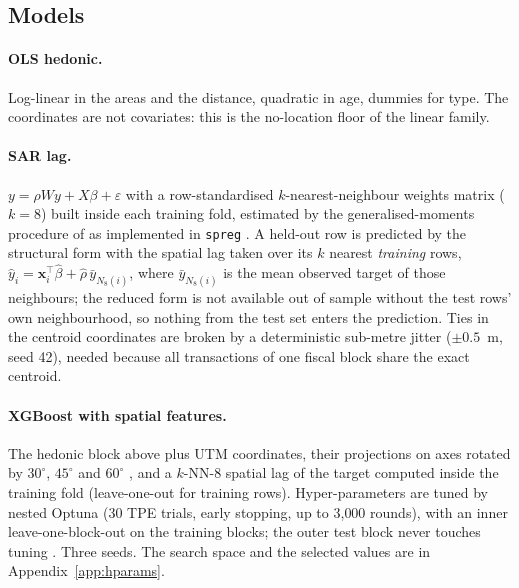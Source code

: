 \documentclass[11pt,a4paper]{article}
\begin{document}
\subsection{Models}

\paragraph{OLS hedonic.} Log-linear in the areas and the distance, quadratic in age, dummies for
type. The coordinates are not covariates: this is the no-location floor of the linear family.

\paragraph{SAR lag.} $y = \rho W y + X\beta + \varepsilon$ with a row-standardised
$k$-nearest-neighbour weights matrix ($k = 8$) built inside each training fold, estimated by the
generalised-moments procedure of \citet{kelejian1998} as implemented in \texttt{spreg}
\citep{rey2010pysal}. A held-out row is predicted by the structural form with the spatial lag
taken over its $k$ nearest \emph{training} rows,
$\hat y_i = \mathbf{x}_i^{\top}\hat\beta + \hat\rho\,\bar y_{N_8(i)}$, where $\bar y_{N_8(i)}$ is
the mean observed target of those neighbours; the reduced form is not available out of sample
without the test rows' own neighbourhood, so nothing from the test set enters the prediction.
Ties in the centroid coordinates are broken by a deterministic sub-metre jitter
($\pm 0.5$~m, seed 42), needed because all transactions of one fiscal block share the exact
centroid.

\paragraph{XGBoost with spatial features.} The hedonic block above plus UTM coordinates, their
projections on axes rotated by $30^{\circ}$, $45^{\circ}$ and $60^{\circ}$ \citep{moller2020},
and a $k$-NN-8 spatial lag of the target computed inside the training fold (leave-one-out for
training rows). Hyper-parameters are tuned by nested Optuna (30 TPE trials, early stopping, up
to 3{,}000 rounds), with an inner leave-one-block-out on the training blocks; the outer test
block never touches tuning \citep{chen2016xgboost,akiba2019optuna}. Three seeds. The search
space and the selected values are in Appendix~\ref{app:hparams}.
\end{document}
